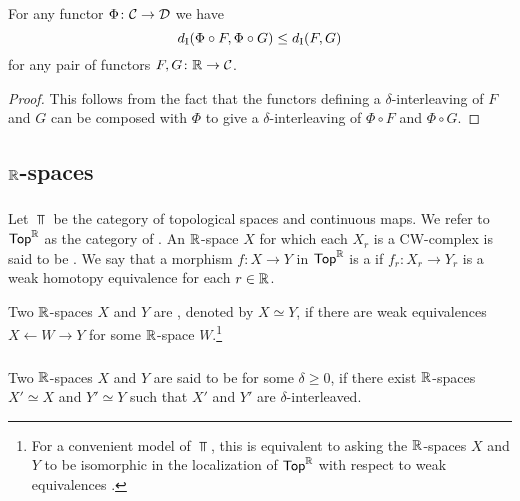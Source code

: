 \medskip\lemma For any functor $\Phi \colon \mathcal{C} \to \mathcal{D}$ we have
\[
d_{\mathrm{I}}(\Phi \circ F, \Phi \circ G) \leq d_{\mathrm{I}}(F, G)
\]
for any pair of functors $F, G \colon \mathbb{R} \to \mathcal{C}$.

\begin{proof}
	This follows from the fact that the functors defining a $\delta$-interleaving of $F$ and $G$ can be composed with $\Phi$ to give a $\delta$-interleaving of $\Phi \circ F$ and $\Phi \circ G$.
\end{proof}


\subsection{$\mathbb{R}$-spaces}

\subsubsection{}

Let $\Top$ be the category of topological spaces and continuous maps.
We refer to $\mathsf{Top}^{\mathbb{R}}$ as the category of .
An $\mathbb{R}$-space $X$ for which each $X_r$ is a CW-complex is said to be .
We say that a morphism $f \colon X \to Y$ in $\mathsf{Top}^{\mathbb{R}}$ is a  if $f_r \colon X_r \to Y_r$ is a weak homotopy equivalence for each $r \in \mathbb{R}$.

Two $\mathbb{R}$-spaces $X$ and $Y$ are , denoted by $X \simeq Y$, if there are weak equivalences $X \leftarrow W \rightarrow Y$ for some $\mathbb{R}$-space $W$.\footnote{
For a convenient model of $\Top$, this is equivalent to asking the $\mathbb{R}$-spaces $X$ and $Y$ to be isomorphic in the localization of $\mathsf{Top}^{\mathbb{R}}$ with respect to weak equivalences \cite{blumberg2023interleaving}.}

\subsubsection{}\label{def:dhi}

Two $\mathbb{R}$-spaces $X$ and $Y$ are said to be  for some $\delta \geq 0$, if there exist $\mathbb{R}$-spaces $X' \simeq X$ and $Y' \simeq Y$ such that $X'$ and $Y'$ are $\delta$-interleaved.

